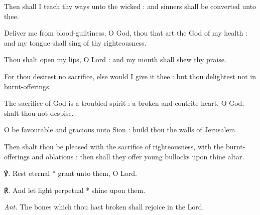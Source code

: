 Then shall I teach thy ways unto the wicked : and sinners shall be converted unto thee.\par
{}Deliver me from blood-guiltiness, O God, thou that art the God of my health : and my tongue shall sing of thy righteousness.\par
{}Thou shalt open my lips, O Lord : and my mouth shall shew thy praise.\par
{}For thou desirest no sacrifice, else would I give it thee : but thou delightest not in burnt-offerings.\par
{}The sacrifice of God is a troubled spirit : a broken and contrite heart, O God, shalt thou not despise.\par
{}O be favourable and gracious unto Sion : build thou the walls of Jerusalem.\par
{}Then shalt thou be pleased with the sacrifice of righteousness, with the burnt-offerings and oblations : then shall they offer young bullocks upon thine altar.\par
℣. Rest eternal * grant unto them, O Lord.\par
℟. And let light perpetual * shine upon them.\par\noindent
\textit{Ant.} The bones which thou hast broken shall rejoice in the Lord.

